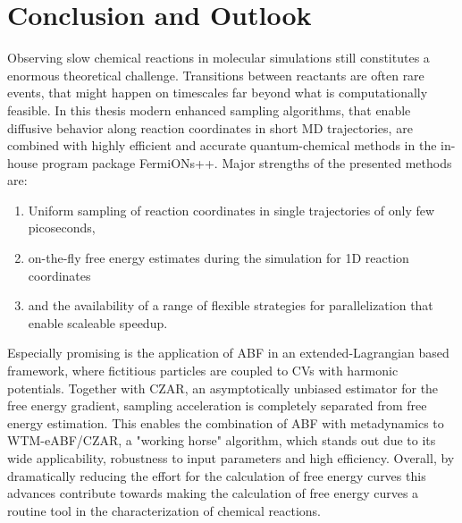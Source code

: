 \chapter{Conclusion and Outlook}
\label{cha:conclusion}
Observing slow chemical reactions in molecular simulations still constitutes a enormous theoretical challenge.
Transitions between reactants are often rare events, that might happen on timescales far beyond what is computationally feasible.
In this thesis modern enhanced sampling algorithms, that enable diffusive behavior along reaction coordinates in short MD trajectories, are combined with highly efficient and accurate quantum-chemical methods in the in-house program package FermiONs++.
Major strengths of the presented methods are:
\begin{enumerate}
  \item Uniform sampling of reaction coordinates in single trajectories of only few picoseconds,
  \item on-the-fly free energy estimates during the simulation for 1D reaction coordinates
  \item and the availability of a range of flexible strategies for parallelization that enable scaleable speedup.
\end{enumerate}
Especially promising is the application of ABF in an extended-Lagrangian based framework, where fictitious particles are coupled to CVs with harmonic potentials.
Together with CZAR, an asymptotically unbiased estimator for the free energy gradient, sampling acceleration is completely separated from free energy estimation.
This enables the combination of ABF with metadynamics to WTM-eABF/CZAR, a "working horse" algorithm, which stands out due to its wide applicability, robustness to input parameters and high efficiency.
Overall, by dramatically reducing the effort for the calculation of free energy curves this advances contribute towards making the calculation of free energy curves a routine tool in the characterization of chemical reactions.

